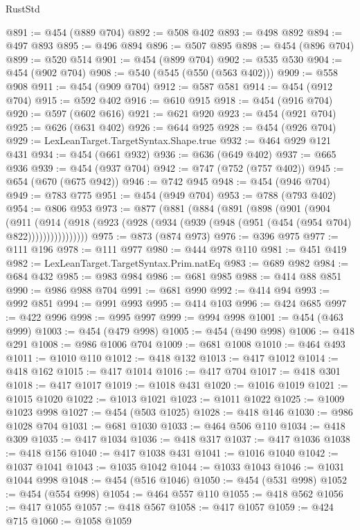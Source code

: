 \begin{lexlean}{RustStd}
\begin{coremodule}
{\begin{coremodule}
{{{{{{{{{{{{{{{{{{{{{{{{{{{{{{{{@891 := @454 (@889 @704)
@892 := @508 @402
@893 := @498 @892
@894 := @497 @893
@895 := @496 @894
@896 := @507 @895
@898 := @454 (@896 @704)
@899 := @520 @514
@901 := @454 (@899 @704)
@902 := @535 @530
@904 := @454 (@902 @704)
@908 := @540 (@545 (@550 (@563 @402)))
@909 := @558 @908
@911 := @454 (@909 @704)
@912 := @587 @581
@914 := @454 (@912 @704)
@915 := @592 @402
@916 := @610 @915
@918 := @454 (@916 @704)
@920 := @597 (@602 @616)
@921 := @621 @920
@923 := @454 (@921 @704)
@925 := @626 (@631 @402)
@926 := @644 @925
@928 := @454 (@926 @704)
@929 := LexLeanTarget.TargetSyntax.Shape.true
@932 := @464 @929 @121 @431
@934 := @454 (@661 @932)
@936 := @636 (@649 @402)
@937 := @665 @936
@939 := @454 (@937 @704)
@942 := @747 (@752 (@757 @402))
@945 := @654 (@670 (@675 @942))
@946 := @742 @945
@948 := @454 (@946 @704)
@949 := @783 @775
@951 := @454 (@949 @704)
@953 := @788 (@793 @402)
@954 := @806 @953
@973 := @877
    (@881
      (@884
        (@891
          (@898
            (@901
              (@904
                (@911
                  (@914
                    (@918 (@923 (@928 (@934 (@939 (@948 (@951 (@454 (@954 @704) @822))))))))))))))))
@975 := @873 (@874 @973)
@976 := @396 @975
@977 := @111 @196
@978 := @111 @977
@980 := @444 @978 @110
@981 := @451 @419
@982 := LexLeanTarget.TargetSyntax.Prim.natEq
@983 := @689 @982
@984 := @684 @432
@985 := @983 @984
@986 := @681 @985
@988 := @414 @88 @851
@990 := @986 @988 @704
@991 := @681 @990
@992 := @414 @94
@993 := @992 @851
@994 := @991 @993
@995 := @414 @103
@996 := @424 @685
@997 := @422 @996
@998 := @995 @997
@999 := @994 @998
@1001 := @454 (@463 @999)
@1003 := @454 (@479 @998)
@1005 := @454 (@490 @998)
@1006 := @418 @291
@1008 := @986 @1006 @704
@1009 := @681 @1008
@1010 := @464 @493
@1011 := @1010 @110
@1012 := @418 @132
@1013 := @417 @1012
@1014 := @418 @162
@1015 := @417 @1014
@1016 := @417 @704
@1017 := @418 @301
@1018 := @417 @1017
@1019 := @1018 @431
@1020 := @1016 @1019
@1021 := @1015 @1020
@1022 := @1013 @1021
@1023 := @1011 @1022
@1025 := @1009 @1023 @998
@1027 := @454 (@503 @1025)
@1028 := @418 @146
@1030 := @986 @1028 @704
@1031 := @681 @1030
@1033 := @464 @506 @110
@1034 := @418 @309
@1035 := @417 @1034
@1036 := @418 @317
@1037 := @417 @1036
@1038 := @418 @156
@1040 := @417 @1038 @431
@1041 := @1016 @1040
@1042 := @1037 @1041
@1043 := @1035 @1042
@1044 := @1033 @1043
@1046 := @1031 @1044 @998
@1048 := @454 (@516 @1046)
@1050 := @454 (@531 @998)
@1052 := @454 (@554 @998)
@1054 := @464 @557 @110
@1055 := @418 @562
@1056 := @417 @1055
@1057 := @418 @567
@1058 := @417 @1057
@1059 := @424 @715
@1060 := @1058 @1059
}}}}}}}}}}}}}}}}}}}}}}}}}}}}}}}}
\end{coremodule}}
\end{coremodule}
\end{lexlean}

